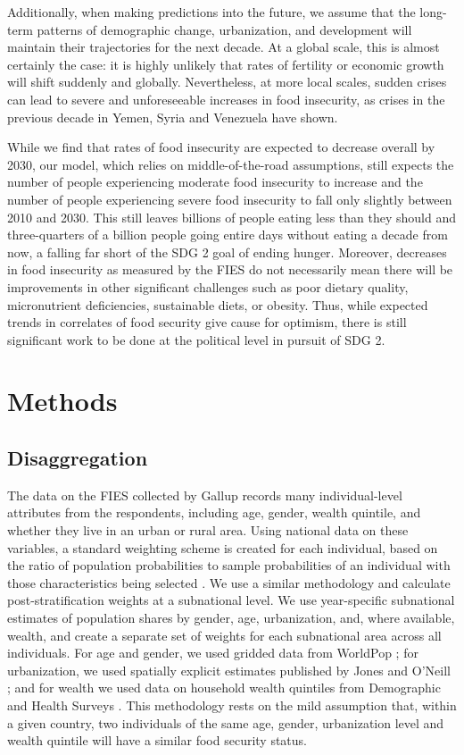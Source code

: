 \documentclass{article}
\begin{document}
Additionally, when making predictions into the future, we assume that the long-term patterns of demographic change, urbanization, and development will maintain their trajectories for the next decade.  At a global scale, this is almost certainly the case: it is highly unlikely that rates of fertility or economic growth will shift suddenly and globally.  Nevertheless, at more local scales, sudden crises can lead to severe and unforeseeable increases in food insecurity, as crises in the previous decade in Yemen, Syria and Venezuela have shown.

While we find that rates of food insecurity are expected to decrease overall by 2030, our model, which relies on middle-of-the-road assumptions, still expects the number of people experiencing moderate food insecurity to increase and the number of people experiencing severe food insecurity to fall only slightly between 2010 and 2030.  This still leaves billions of people eating less than they should and three-quarters of a billion people going entire days without eating a decade from now, a falling far short of the SDG 2 goal of ending hunger.  Moreover, decreases in food insecurity as measured by the FIES do not necessarily mean there will be improvements in other significant challenges such as poor dietary quality, micronutrient deficiencies, sustainable diets, or obesity.  Thus, while expected trends in correlates of food security give cause for optimism, there is still significant work to be done at the political level in pursuit of SDG 2.

\section{Methods}
\subsection{Disaggregation}
The data on the FIES collected by Gallup records many individual-level attributes from the respondents, including age, gender, wealth quintile, and whether they live in an urban or rural area.  Using national data on these variables, a standard weighting scheme is created for each individual, based on the ratio of population probabilities to sample probabilities of an individual with those characteristics being selected \citep{bethlehem2009applied}.  We use a similar methodology and calculate post-stratification weights at a subnational level.  We use year-specific subnational estimates of population shares by gender, age, urbanization, and, where available, wealth, and create a separate set of weights for each subnational area across all individuals.  For age and gender, we used gridded data from WorldPop \citep{Tatem2017}; for urbanization, we used spatially explicit estimates published by Jones and O'Neill \citep{Jones2016}; and for wealth we used data on household wealth quintiles from Demographic and Health Surveys \citep{dhsall}.  This methodology rests on the mild assumption that, within a given country, two individuals of the same age, gender, urbanization level and wealth quintile will have a similar food security status.
\end{document}

